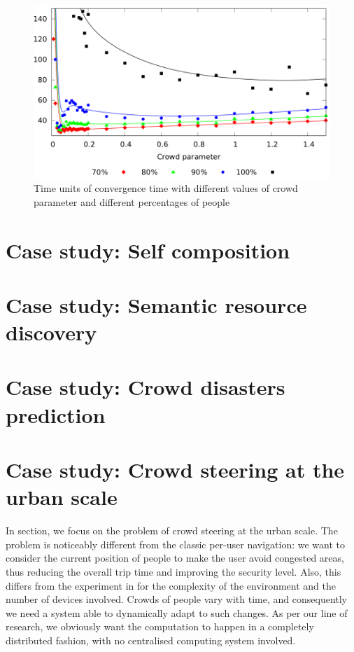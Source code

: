 \documentclass[12pt,a4paper,twoside,openright]{book}
\begin{document}
\begin{figure}
\begin{center}
   \includegraphics[width=0.99\columnwidth]{img/jos-graph}
   \vspace{-10pt}\caption[Crowd parameter]{Time units of convergence time with different values of crowd parameter and different percentages of people}\label{img:jos-graph}\vspace{-10pt}
\end{center}
\end{figure}


\section{Case study: Self composition}
\section{Case study: Semantic resource discovery}
\section{Case study: Crowd disasters prediction}
\section{Case study: Crowd steering at the urban scale}
\label{ahpc-steering}
In section, we focus on the problem of crowd steering at the urban scale.
%
The problem is noticeably different from the classic per-user navigation: we want to consider the current position of people to make the user avoid congested areas, thus reducing the overall trip time and improving the security level.
%
Also, this differs from the experiment in  for the complexity of the environment and the number of devices involved.
%
Crowds of people vary with time, and consequently we need a system able to dynamically adapt to such changes.
%
As per our line of research, we obviously want the computation to happen in a completely distributed fashion, with no centralised computing system involved.
\end{document}
